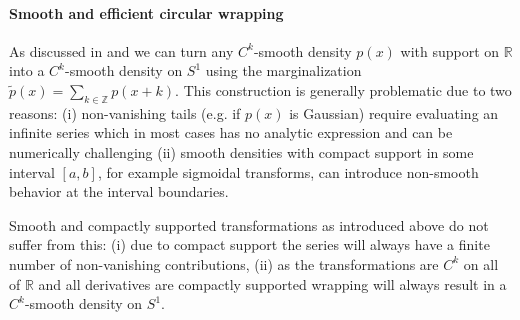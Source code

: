 \documentclass{article}
\begin{document}
\paragraph{Smooth and efficient circular wrapping}
As discussed in \citet{rezende2020normalizing} and \citet{falorsi2019reparameterizing} we can turn any $C^{k}$-smooth density $p(x)$ with support on $\mathbb{R}$ into a $C^{k}$-smooth density on $S^1$ using the marginalization $\tilde p(x) = \sum_{k \in \mathbb{Z}} p(x + k)$.
This construction is generally problematic due to two reasons: (i) non-vanishing tails (e.g. if $p(x)$ is Gaussian) require evaluating an infinite series which in most cases has no analytic expression and can be numerically challenging (ii) smooth densities with compact support in some interval $[a, b]$, for example sigmoidal transforms, can introduce non-smooth behavior at the interval boundaries.

Smooth and compactly supported transformations as introduced above do not suffer from this: (i) due to compact support the series will always have a finite number of non-vanishing contributions, (ii) as the transformations are $C^{k}$ on all of $\mathbb{R}$ and all derivatives are compactly supported wrapping will always result in a $C^{k}$-smooth density on $S^1$.
\end{document}
